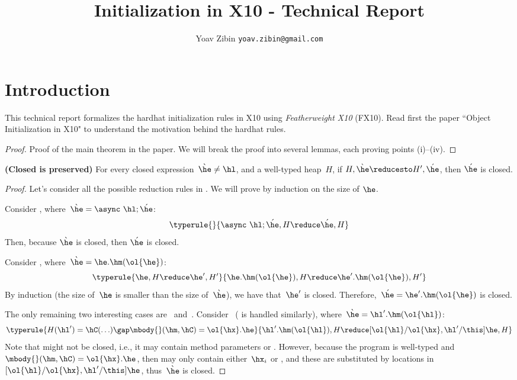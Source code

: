 \documentclass[a4paper]{article}
\title{Initialization in X10 - Technical Report}
\author{Yoav Zibin \texttt{yoav.zibin@gmail.com}}
\date{}
\begin{document}
\maketitle


\lstset{language=java,basicstyle=\ttfamily\small}

\section{Introduction}
This technical report formalizes the hardhat initialization rules in X10
    using \emph{Featherweight X10} (FX10).
Read first the paper ``Object Initialization in X10" to understand the motivation behind the hardhat rules.

\begin{proof}
Proof of the main theorem in the paper.
We will break the proof into several lemmas, each proving points (i)--(iv).
\end{proof}


\begin{Lemma}[closed]
  \textbf{(Closed is preserved)}
    For every closed expression~$\grave{\he} \neq \hl$, and a well-typed heap~$H$,
        if $H,\grave{\he} \reducesto H',\acute{\he}$,
        then $\acute{\he}$ is closed.
\end{Lemma}
\begin{proof}
Let's consider all the possible reduction rules in .
We will prove by induction on the size of $\he$.

Consider , where~$\grave{\he} = \async~\hl;\acute{\he}$:
\[\typerule{
}{
  \async~\hl;\acute{\he},H \reduce \acute{\he},H
}
\]
Then, because $\grave{\he}$ is closed, then $\acute{\he}$ is closed.

Consider , where~$\grave{\he} = \he.\hm(\ol{\he})$:
\[\typerule{
    \he,H \reduce \he',H'
}{
  \he.\hm(\ol{\he}),H \reduce \he'.\hm(\ol{\he}),H'
}
\]
By induction (the size of~$\he$ is smaller than the size of~$\grave{\he}$), we have that~$\he'$ is closed.
Therefore,~$\acute{\he} = \he'.\hm(\ol{\he})$ is closed.

The only remaining two interesting cases are~ and~.
Consider~ ( is handled similarly), where~$\grave{\he} = \hl'.\hm(\ol{\hl})$:
\[
\typerule{
    H(\hl')=\hC(\ldots)
        \gap
    \mbody{}(\hm,\hC)=\ol{\hx}.\he
}{
  \hl'.\hm(\ol{\hl}),H \reduce [\ol{\hl}/\ol{\hx},\hl'/\this]\he,H
}
\]
Note that \he might not be closed, i.e., it may contain method parameters or \this.
However, because the program is well-typed and~$\mbody{}(\hm,\hC)=\ol{\hx}.\he$,
    then \he may only contain either~$\hx_i$ or \this,
    and these are substituted by locations in~$[\ol{\hl}/\ol{\hx},\hl'/\this]\he$,
    thus~$\grave{\he}$ is closed.
\end{proof}
\end{document}
